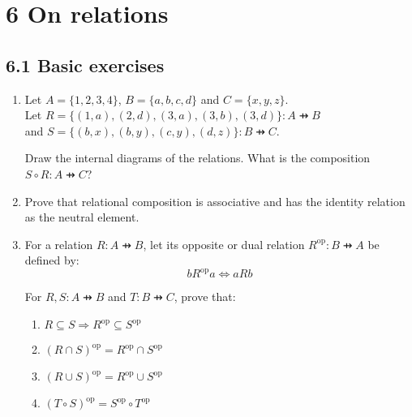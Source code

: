 \documentclass[10pt,\jkfside,a4paper]{article}
\begin{document}
\section*{6 On relations}

\subsection*{6.1 Basic exercises}

\begin{enumerate}

\item Let $A = \{1, 2, 3, 4\}$, $B = \{a, b, c, d\}$ and $C = \{x, y, z\}$.\\
Let $R = \{(1, a), (2, d), (3, a), (3, b), (3, d)\}: A \pfun B$\\
and $S = \{(b, x), (b, y), (c, y), (d, z)\}: B \pfun C$.

Draw the internal diagrams of the relations. What is the composition $S \circ R: A \pfun C$?



\item Prove that relational composition is associative and has the identity relation as the neutral element.



\item For a relation $R: A \pfun B$, let its opposite or dual relation $R^{\text{op}}: B \pfun A$ be defined by:
\begin{equation}
b R^{\text{op}} a \Longleftrightarrow a R b
\end{equation}

For $R, S: A \pfun B$ and $T: B \pfun C$, prove that:

\begin{enumerate}

\item $R \subseteq S \Longrightarrow R^{\text{op}} \subseteq S^{\text{op}}$



\item $(R \cap S)^{\text{op}} = R^{\text{op}} \cap S^{\text{op}}$



\item $(R \cup S)^{\text{op}} = R^{\text{op}} \cup S^{\text{op}}$



\item $(T \circ S)^{\text{op}} = S^{\text{op}} \circ T^{\text{op}}$



\end{enumerate}

\end{enumerate}
\end{document}
